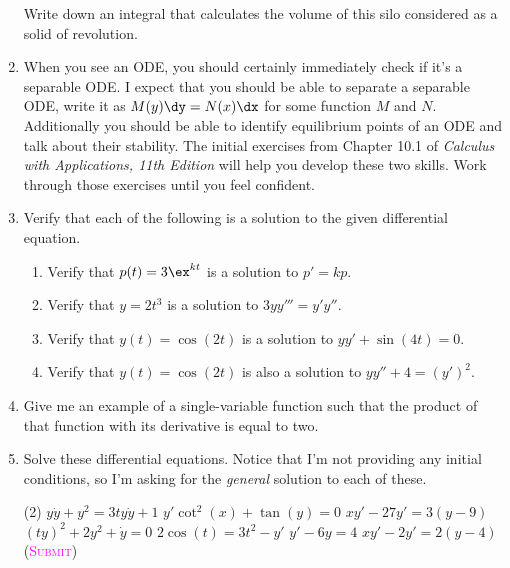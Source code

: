 \begin{enumerate}
        Write down an integral
        that calculates the volume of this silo
        considered as a solid of revolution.

    \item %
        When you see an ODE, you should certainly immediately check
        if it's a separable ODE. I expect that you should be able 
        to separate a separable ODE, write it as $M(y) \dy = N(x)\dx$
        for some function $M$ and $N$.
        Additionally you should be able to identify equilibrium points
        of an ODE and talk about their stability.
        The initial exercises from Chapter 10.1 of 
        \emph{Calculus with Applications, 11th Edition}
        will help you develop these two skills.
        Work through those exercises until you feel confident.

    \item
        Verify that each of the following is a solution 
        to the given differential equation.
        \begin{enumerate}
            \item Verify that $p(t)=3\ex^{kt}$ is a solution to $p'=kp$.
            \item Verify that $y=2t^3$ is a solution to $3yy'''=y'y''$.
            \item Verify that $y(t)=\cos(2t)$ is a solution to $yy'+\sin(4t)=0$.
            \item Verify that $y(t)=\cos(2t)$ is also a solution to 
              $yy''+4=(y')^2$.
        \end{enumerate}

    \newpage

    \item
        Give me an example of a single-variable function
        such that the product of that function with its derivative 
        is equal to two.

    \item 
        Solve these differential equations.
        Notice that I'm not providing any initial conditions,
        so I'm asking for the \emph{general} solution to each of these.
        \begin{tasks}(2)
            \task $y\dot{y} + y^2 = 3ty\dot{y}+1$
            \task $y'\cot^2(x) + \tan(y) = 0$
            \task $xy' - 27y' = 3(y-9)$
            \task $(ty)^2+2y^2 + \dot{y} = 0$
            \task $2\cos(t) = 3t^2-y'$
            \task $y'-6y = 4$
            \task $xy' - 2y' = 2(y-4)$ (\textsc{\textcolor{magenta}{Submit}})
        \end{tasks}


\end{enumerate}
